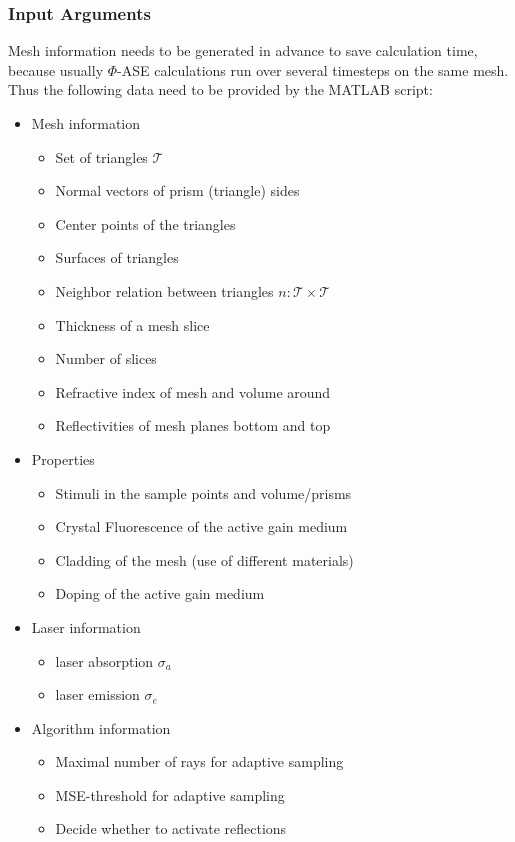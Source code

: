 \subsubsection{Input Arguments}
Mesh information needs to be generated in advance
to save calculation time, because usually $\Phi$-ASE calculations
run over several timesteps on the same mesh. Thus the following
data need to be provided by the MATLAB script:
\begin{itemize}
  \label{label:input}
  \item Mesh information
    \begin{itemize}
    \item Set of triangles $\mathcal{T}$
    \item Normal vectors of prism (triangle) sides
    \item Center points of the triangles
    \item Surfaces of triangles
    \item Neighbor relation between triangles $n : \mathcal{T} \times \mathcal{T}$
    \item Thickness of a mesh slice 
    \item Number of slices
    \item Refractive index of mesh and volume around
    \item Reflectivities of mesh planes bottom and top
    \end{itemize}

  \item Properties 
    \begin{itemize}
      \item Stimuli in the sample points and volume/prisms
      \item Crystal Fluorescence of the active gain medium
      \item Cladding of the mesh (use of different materials)
      \item Doping of the active gain medium
    \end{itemize}

  \item Laser information
    \begin{itemize}
      \item laser absorption $\sigma_a$
      \item laser emission $\sigma_e$
    \end{itemize}

  \item Algorithm information
    \begin{itemize}
      \item Maximal number of rays for adaptive sampling
      \item MSE-threshold for adaptive sampling
      \item Decide whether to activate reflections
    \end{itemize}
    
\end{itemize}

